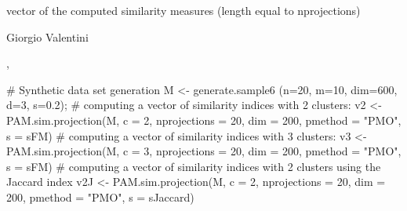 \documentclass{article}
\begin{document}
\begin{Value}
vector of the computed similarity measures (length equal to nprojections)
\end{Value}
\begin{Author}\relax
Giorgio Valentini 
\end{Author}
\begin{SeeAlso}\relax
{}, 
\end{SeeAlso}
\begin{Examples}
\begin{ExampleCode}
# Synthetic data set generation
M <- generate.sample6 (n=20, m=10, dim=600, d=3, s=0.2);
# computing a vector of similarity indices with 2 clusters:
v2 <- PAM.sim.projection(M, c = 2, nprojections = 20, dim = 200, 
                         pmethod = "PMO", s = sFM)
# computing a vector of similarity indices with 3 clusters:
v3 <- PAM.sim.projection(M, c = 3, nprojections = 20, dim = 200, 
                         pmethod = "PMO", s = sFM)
# computing a vector of similarity indices with 2 clusters using the Jaccard index
v2J <- PAM.sim.projection(M, c = 2, nprojections = 20, dim = 200, 
                          pmethod = "PMO", s = sJaccard)
\end{ExampleCode}
\end{Examples}
\end{document}
